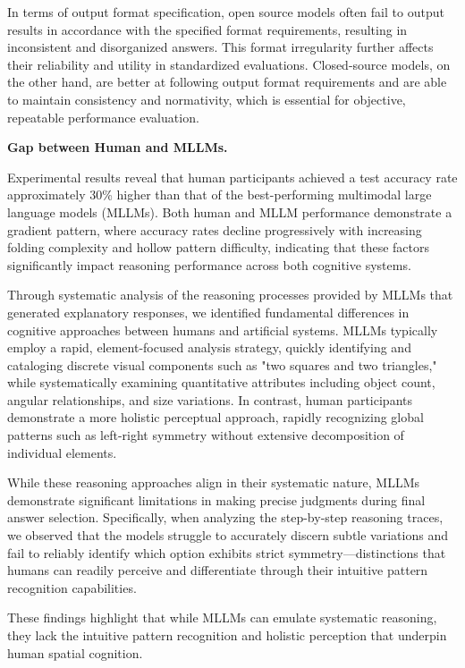 \documentclass[letterpaper]{article} %
\begin{document}
In terms of output format specification, open source models often fail to output results in accordance with the specified format requirements, resulting in inconsistent and disorganized answers. This format irregularity further affects their reliability and utility in standardized evaluations. Closed-source models, on the other hand, are better at following output format requirements and are able to maintain consistency and normativity, which is essential for objective, repeatable performance evaluation.

\noindent \textbf{Gap between Human and MLLMs.}

Experimental results reveal that human participants achieved a test accuracy rate approximately 30\% higher than that of the best-performing multimodal large language models (MLLMs). Both human and MLLM performance demonstrate a gradient pattern, where accuracy rates decline progressively with increasing folding complexity and hollow pattern difficulty, indicating that these factors significantly impact reasoning performance across both cognitive systems.

Through systematic analysis of the reasoning processes provided by MLLMs that generated explanatory responses, we identified fundamental differences in cognitive approaches between humans and artificial systems. MLLMs typically employ a rapid, element-focused analysis strategy, quickly identifying and cataloging discrete visual components such as "two squares and two triangles," while systematically examining quantitative attributes including object count, angular relationships, and size variations. In contrast, human participants demonstrate a more holistic perceptual approach, rapidly recognizing global patterns such as left-right symmetry without extensive decomposition of individual elements.

While these reasoning approaches align in their systematic nature, MLLMs demonstrate significant limitations in making precise judgments during final answer selection. Specifically, when analyzing the step-by-step reasoning traces, we observed that the models struggle to accurately discern subtle variations and fail to reliably identify which option exhibits strict symmetry—distinctions that humans can readily perceive and differentiate through their intuitive pattern recognition capabilities.

These findings highlight that while MLLMs can emulate systematic reasoning, they lack the intuitive pattern recognition and holistic perception that underpin human spatial cognition.
\end{document}
